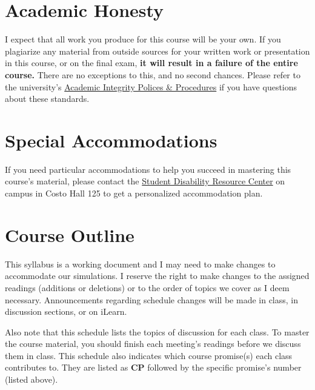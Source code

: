 \documentclass[11pt]{article}
\begin{document}
\section*{Academic Honesty}

I expect that all work you produce for this course will be your own. If you plagiarize any material from outside sources for your written work or presentation in this course, or on the final exam, \textbf{it will result in a failure of the entire course.} There are no exceptions to this, and no second chances. Please refer to the university's \href{https://conduct.ucr.edu/policies/academic-integrity-policies-and-procedures}{Academic Integrity Polices \& Procedures} if you have questions about these standards. 


\section*{Special Accommodations}

If you need particular accommodations to help you succeed in mastering this course's material, please contact the \href{https://sdrc.ucr.edu}{Student Disability Resource Center} on campus in Costo Hall 125 to get a personalized accommodation plan.


\section*{Course Outline}

This syllabus is a working document and I may need to make changes to accommodate our simulations. I reserve the right to make changes to the assigned readings (additions or deletions) or to the order of topics we cover as I deem necessary. Announcements regarding schedule changes will be made in class, in discussion sections, or on iLearn.

Also note that this schedule lists the topics of discussion for each class. To master the course material, you should finish each meeting's readings before we discuss them in class. This schedule also indicates which course promise(s) each class contributes to. They are listed as \textbf{CP} followed by the specific promise's number (listed above). 
\end{document}
